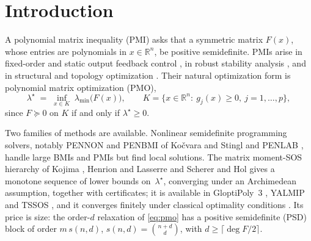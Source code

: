 \documentclass[smallextended]{svjour3}
\newcommand{\R}{\mathbb{R}}
\newcommand{\lmin}{\lambda_{\min}}
\newcommand{\sz}[2]{s(#1,#2)}
\begin{document}
\section{Introduction}
\label{sec:intro}

A polynomial matrix inequality (PMI) asks that a symmetric matrix $F(x)$,
whose entries are polynomials in $x\in\R^n$, be positive semidefinite. PMIs
arise in fixed-order and static output feedback control
\cite{HenrionSebekKucera2003,HenrionLasserre2006,HenrionLofbergKocvaraStingl2005},
in robust stability analysis \cite{HenrionLasserre2012}, and in structural
and topology optimization \cite{Kocvara2021,HandaTyburecKocvara2025,HandaEtAl2025}.
Their natural optimization
form is polynomial matrix optimization (PMO),
\begin{equation}
\label{eq:pmo}
\lambda^\star \;=\; \inf_{x\in K}\; \lmin\bigl(F(x)\bigr),\qquad
K=\{x\in\R^n:\ g_j(x)\ge 0,\ j=1,\dots,p\},
\end{equation}
since $F\succeq 0$ on $K$ if and only if $\lambda^\star\ge 0$.

Two families of methods are available. Nonlinear semidefinite programming
solvers, notably PENNON and PENBMI of Ko\v{c}vara and Stingl
\cite{KocvaraStingl2003,HenrionLofbergKocvaraStingl2005} and PENLAB
\cite{PENLAB}, handle large BMIs and PMIs but find local solutions.
The matrix moment-SOS hierarchy of Kojima \cite{Kojima2003}, Henrion and
Lasserre \cite{HenrionLasserre2006} and Scherer and Hol \cite{SchererHol2006}
gives a monotone sequence of lower bounds on~$\lambda^\star$, converging
under an Archimedean assumption, together with certificates; it is
available in GloptiPoly~3 \cite{GloptiPoly3}, YALMIP \cite{YALMIP2004} and
TSSOS \cite{TSSOS2021}, and it converges finitely under classical
optimality conditions \cite{HuangNie2025}. Its price is size: the order-$d$ relaxation of
\eqref{eq:pmo} has a positive semidefinite (PSD) block of order
$m\,\sz{n}{d}$, $\sz{n}{d}=\binom{n+d}{d}$, with $d\ge\lceil\deg F/2\rceil$.
\end{document}

